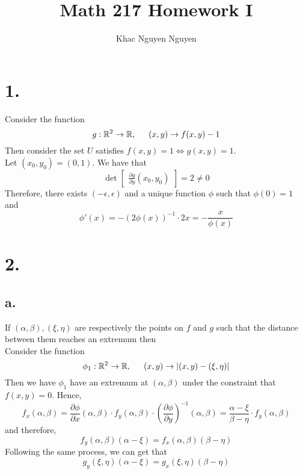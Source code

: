 \documentclass[11pt]{article}
\title{\textbf{Math 217 Homework I}}
\author{Khac Nguyen Nguyen}
\date{}
\begin{document}
\section*{1.}
Consider the function
\[
    g: \mathbb{R}^2 \to \mathbb{R}, \indent (x,y) \to f(x,y)-1
\]
Then consider the set $U$ satisfies $f(x,y) = 1 \iff g(x,y)=1$. \\
Let $(x_0,y_0) = (0,1)$. We have that 
\[
    \det 
    \begin{bmatrix} 
        \frac{\partial g}{\partial y} (x_0,y_0)
    \end{bmatrix} 
    = 2 \ne 0   
\]
Therefore, there exists $(-\epsilon, \epsilon)$ and a unique function $\phi$ such that
$\phi(0) = 1$ and
\[
    \phi'(x) = -\left( 2 \phi(x)\right)^{-1} \cdot 2x = -\frac{x}{\phi(x)}    
\]
\pagebreak
\section*{2.}
\subsection*{a.}
If $(\alpha, \beta), (\xi, \eta)$ are respectively the points on $f$ and $g$ such that 
the distance between them reaches an extremum then  \\
Consider the function 
\[
    \phi_1: \mathbb{R}^2 \to \mathbb{R}, \indent (x,y) \to |(x,y)- (\xi, \eta)|
\]
Then we have $\phi_1$ have an extremum at $(\alpha, \beta)$ under the constraint that $f(x,y) = 0$.
Hence, 
\[
    f_x(\alpha,\beta) = \frac{\partial \phi}{\partial x}(\alpha, \beta) \cdot f_y (\alpha, \beta) \cdot \left(\frac{\partial \phi}{\partial y}\right)^{-1}(\alpha, \beta) = \frac{\alpha - \xi}{\beta - \eta} \cdot f_y(\alpha, \beta)  
\]
and therefore, 
\[
    f_y(\alpha, \beta)(\alpha-\xi) = f_x(\alpha, \beta)(\beta - \eta)
\]
Following the same process, we can get that
\[
    g_y(\xi, \eta)(\alpha-\xi) = g_x(\xi, \eta)(\beta - \eta)
\]
\end{document}
